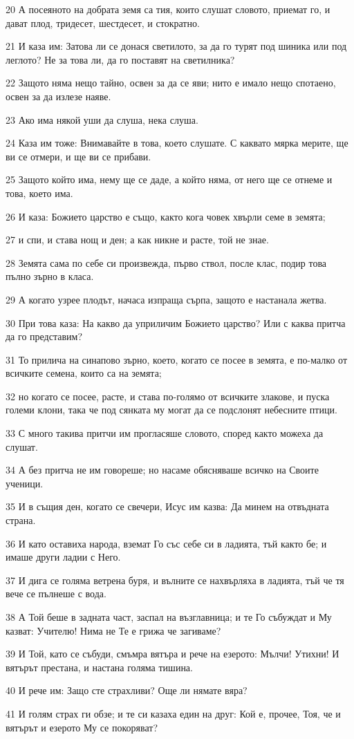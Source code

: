 \par 20 А посеяното на добрата земя са тия, които слушат словото, приемат го, и дават плод, тридесет, шестдесет, и стократно.
\par 21 И каза им: Затова ли се донася светилото, за да го турят под шиника или под леглото? Не за това ли, да го поставят на светилника?
\par 22 Защото няма нещо тайно, освен за да се яви; нито е имало нещо спотаено, освен за да излезе наяве.
\par 23 Ако има някой уши да слуша, нека слуша.
\par 24 Каза им тоже: Внимавайте в това, което слушате. С каквато мярка мерите, ще ви се отмери, и ще ви се прибави.
\par 25 Защото който има, нему ще се даде, а който няма, от него ще се отнеме и това, което има.
\par 26 И каза: Божието царство е също, както кога човек хвърли семе в земята;
\par 27 и спи, и става нощ и ден; а как никне и расте, той не знае.
\par 28 Земята сама по себе си произвежда, първо ствол, после клас, подир това пълно зърно в класа.
\par 29 А когато узрее плодът, начаса изпраща сърпа, защото е настанала жетва.
\par 30 При това каза: На какво да уприличим Божието царство? Или с каква притча да го представим?
\par 31 То прилича на синапово зърно, което, когато се посее в земята, е по-малко от всичките семена, които са на земята;
\par 32 но когато се посее, расте, и става по-голямо от всичките злакове, и пуска големи клони, така че под сянката му могат да се подслонят небесните птици.
\par 33 С много такива притчи им прогласяше словото, според както можеха да слушат.
\par 34 А без притча не им говореше; но насаме обясняваше всичко на Своите ученици.
\par 35 И в същия ден, когато се свечери, Исус им казва: Да минем на отвъдната страна.
\par 36 И като оставиха народа, вземат Го със себе си в ладията, тъй както бе; и имаше други ладии с Него.
\par 37 И дига се голяма ветрена буря, и вълните се нахвърляха в ладията, тъй че тя вече се пълнеше с вода.
\par 38 А Той беше в задната част, заспал на възглавница; и те Го събуждат и Му казват: Учителю! Нима не Те е грижа че загиваме?
\par 39 И Той, като се събуди, смъмра вятъра и рече на езерото: Мълчи! Утихни! И вятърът престана, и настана голяма тишина.
\par 40 И рече им: Защо сте страхливи? Още ли нямате вяра?
\par 41 И голям страх ги обзе; и те си казаха един на друг: Кой е, прочее, Тоя, че и вятърът и езерото Му се покоряват?

